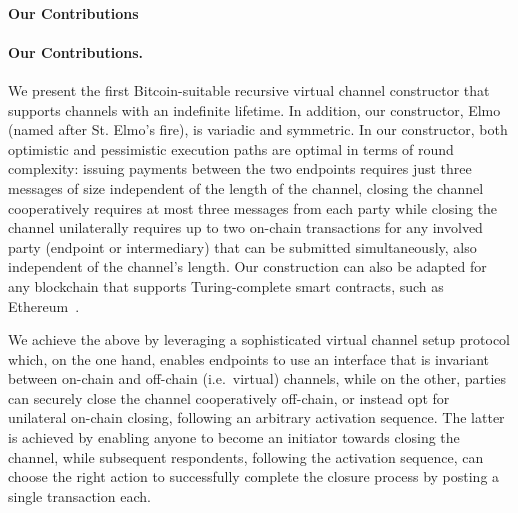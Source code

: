 \makeatletter%
%
  {\paragraph{Our Contributions}}%
  {\paragraph{Our Contributions.}}%
\makeatother%
 We present the first Bitcoin-suitable
recursive virtual channel constructor that supports channels
with an indefinite lifetime. In addition, our constructor, Elmo (named after St.
Elmo's fire), is variadic and symmetric. In our constructor, both optimistic and
pessimistic execution paths are optimal in terms of round complexity: issuing
payments between the two endpoints requires just three messages of size
independent of the length of the channel, closing the channel cooperatively
requires at most three messages from each party while
closing the channel unilaterally requires up to two on-chain transactions for
any involved party (endpoint or intermediary) that can be submitted
simultaneously, also independent of the channel's length. Our
construction can also be adapted for any blockchain that
supports Turing-complete smart contracts, such as
Ethereum~\cite{wood2014ethereum}.

We achieve the above by leveraging a sophisticated virtual channel setup
protocol which, on the one hand, enables endpoints to use an interface that is
invariant between on-chain and off-chain (i.e.\ virtual) channels,
while on the other, parties can securely close the channel cooperatively
off-chain, or instead opt for unilateral on-chain closing, following an arbitrary
activation sequence. The latter is achieved by enabling anyone to
become an initiator towards closing the channel, while subsequent respondents, following the activation sequence, can choose the right action to successfully complete the closure process by posting a single transaction each.


